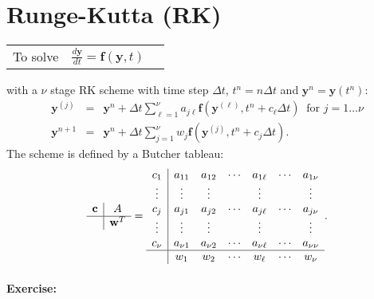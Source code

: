 \clearpage{}

\section*{Runge-Kutta (RK)}

\begin{tabular}{>{\raggedright}p{}>{\centering}p{}>{\raggedleft}p{}}
To solve  & ${\displaystyle \frac{d\mathbf{y}}{dt}=\mathbf{f}(\mathbf{y},t)}$ & \tabularnewline
\end{tabular}

with a $\nu$ stage RK scheme with time step $\Delta t$, $t^{n}=n\Delta t$
and $\mathbf{y}^{n}=\mathbf{y}(t^{n})$:
\begin{eqnarray*}
\mathbf{y}^{(j)} & = & \mathbf{y}^{n}+\Delta t\sum_{\ell=1}^{\nu}a_{j\ell}\mathbf{f}\left(\mathbf{y}^{(\ell)},t^{n}+c_{\ell}\Delta t\right)\ \text{ for }j=1\ldots\nu\\
\mathbf{y}^{n+1} & = & \mathbf{y}^{n}+\Delta t\sum_{j=1}^{\nu}w_{j}\mathbf{f}\left(\mathbf{y}^{(j)},t^{n}+c_{j}\Delta t\right).
\end{eqnarray*}
The scheme is defined by a Butcher tableau:
\[
\begin{array}{c|c}
\mathsf{\mathbf{c}} & A\\
\hline  & \mathbf{w}^{T}
\end{array}=\begin{array}{c|cccccc}
c_{1} & a_{11} & a_{12} & \cdots & a_{1\ell} & \cdots & a_{1\nu}\\
\vdots & \vdots & \vdots &  & \vdots &  & \vdots\\
c_{j} & a_{j1} & a_{j2} & \cdots & a_{j\ell} & \cdots & a_{j\nu}\\
\vdots & \vdots & \vdots &  & \vdots &  & \vdots\\
c_{\nu} & a_{\nu1} & a_{\nu2} & \cdots & a_{\nu\ell} & \cdots & a_{\nu\nu}\\
\hline  & w_{1} & w_{2} & \cdots & w_{\ell} & \cdots & w_{\nu}
\end{array}.
\]

\clearpage{}

\paragraph*{Exercise:}

